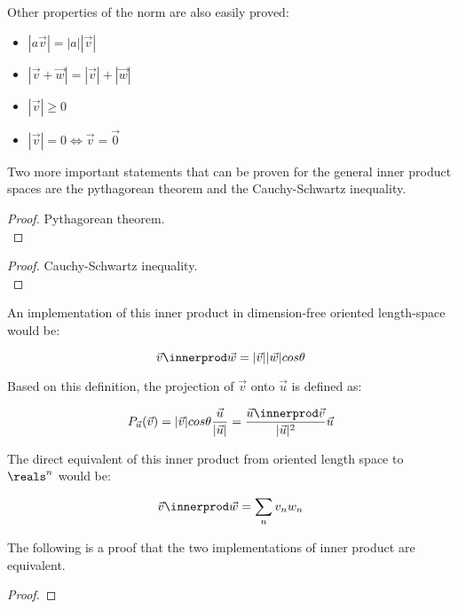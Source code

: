 Other properties of the norm are also easily proved:

\begin{itemize}
    \item $|a\vec{v}| = |a||\vec{v}|$
    \item $|\vec{v} + \vec{w}| = |\vec{v}| + |\vec{w}|$
    \item $|\vec{v}| \geq 0$
    \item $|\vec{v}| = 0 \iff \vec{v} = \vec{0}$
\end{itemize}

Two more important statements that can be proven for the general inner product spaces are the pythagorean theorem and the Cauchy-Schwartz inequality. 

\begin{proof}
    Pythagorean theorem.\\
\end{proof}


\begin{proof}
    Cauchy-Schwartz inequality.\\
\end{proof}


An implementation of this inner product in dimension-free oriented length-space would be:

$$\vec{v} \innerprod \vec{w} = |\vec{v}||\vec{w}|cos\theta$$

Based on this definition, the projection of $\vec{v}$ onto $\vec{u}$ is defined as: 

$$ P_{\vec{u}}(\vec{v}) = |\vec{v}| cos\theta \frac{\vec{u}}{|\vec{u}|} = \frac{\vec{u} \innerprod \vec{v}}{|\vec{u}|^2} \vec{u} $$

The direct equivalent of this inner product from oriented length space to $\reals^n$ would be:

$$ \vec{v} \innerprod \vec{w} = \sum_n v_n w_n $$

The following is a proof that the two implementations of inner product are equivalent. 

\begin{proof}
\end{proof}

